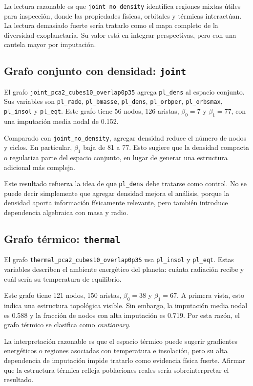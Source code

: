La lectura razonable es que \texttt{joint\_no\_density} identifica regiones mixtas útiles para inspección, donde las propiedades físicas, orbitales y térmicas interactúan. La lectura demasiado fuerte sería tratarlo como el mapa completo de la diversidad exoplanetaria. Su valor está en integrar perspectivas, pero con una cautela mayor por imputación.

\subsection*{Grafo conjunto con densidad: \texttt{joint}}

El grafo \texttt{joint\_pca2\_cubes10\_overlap0p35} agrega \texttt{pl\_dens} al espacio conjunto. Sus variables son \texttt{pl\_rade}, \texttt{pl\_bmasse}, \texttt{pl\_dens}, \texttt{pl\_orbper}, \texttt{pl\_orbsmax}, \texttt{pl\_insol} y \texttt{pl\_eqt}. Este grafo tiene 56 nodos, 126 aristas, $\beta_0=7$ y $\beta_1=77$, con una imputación media nodal de 0.152.

Comparado con \texttt{joint\_no\_density}, agregar densidad reduce el número de nodos y ciclos. En particular, $\beta_1$ baja de 81 a 77. Esto sugiere que la densidad compacta o regulariza parte del espacio conjunto, en lugar de generar una estructura adicional más compleja.

Este resultado refuerza la idea de que \texttt{pl\_dens} debe tratarse como control. No se puede decir simplemente que agregar densidad mejora el análisis, porque la densidad aporta información físicamente relevante, pero también introduce dependencia algebraica con masa y radio.

\subsection*{Grafo térmico: \texttt{thermal}}

El grafo \texttt{thermal\_pca2\_cubes10\_overlap0p35} usa \texttt{pl\_insol} y \texttt{pl\_eqt}. Estas variables describen el ambiente energético del planeta: cuánta radiación recibe y cuál sería su temperatura de equilibrio.

Este grafo tiene 121 nodos, 150 aristas, $\beta_0=38$ y $\beta_1=67$. A primera vista, esto indica una estructura topológica visible. Sin embargo, la imputación media nodal es 0.588 y la fracción de nodos con alta imputación es 0.719. Por esta razón, el grafo térmico se clasifica como \textit{cautionary}.

La interpretación razonable es que el espacio térmico puede sugerir gradientes energéticos o regiones asociadas con temperatura e insolación, pero su alta dependencia de imputación impide tratarlo como evidencia física fuerte. Afirmar que la estructura térmica refleja poblaciones reales sería sobreinterpretar el resultado.


